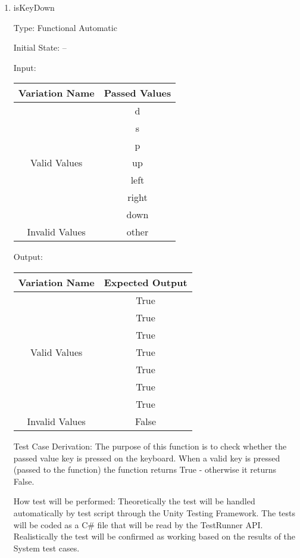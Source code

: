 \documentclass[12pt, titlepage]{article}
\begin{document}
\begin{enumerate}

\item{isKeyDown\\}

Type: Functional Automatic
					
Initial State: --
					
Input: 
\begin{tabular}{|c|c|}
	\hline
	\textbf{Variation Name} & \textbf{Passed Values}\\
	\hline
	\multirow{7}{*}{Valid Values} & d \\
	 & s\\
	 & p\\ 
	 & up \\
	 & left \\
	 & right \\
	 & down \\
	 Invalid Values & other \\
	\hline
\end{tabular}
					
Output: 
\begin{tabular}{|c|c|}
	\hline
	\textbf{Variation Name} & \textbf{Expected Output}\\
	\hline
	\multirow{7}{*}{Valid Values} & True \\
	& True \\
	& True\\ 
	& True \\
	& True \\
	& True \\
	& True \\
	Invalid Values & False \\
	\hline
\end{tabular}

Test Case Derivation: The purpose of this function is to check whether the 
passed value key is pressed on the keyboard. When a valid key is pressed 
(passed to the function) the function returns True - otherwise it returns False.

How test will be performed: Theoretically the test will be handled 
automatically by test script through the Unity Testing Framework. The tests 
will be coded as a C\# file that will be read by the TestRunner API. 
Realistically the test will be confirmed as working based on the results of the 
System test cases.
				
\end{enumerate}
\end{document}

